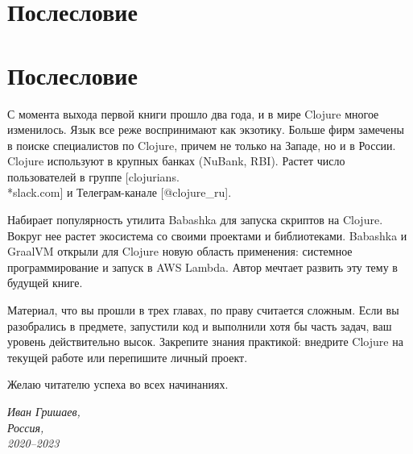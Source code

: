
\ifprint
\chapter{Послесловие}
\else
\chapter*{Послесловие}
\fi

С момента выхода первой книги прошло два года, и в мире Clojure многое
изменилось. Язык все реже воспринимают как экзотику. Больше фирм замечены в
поиске специалистов по Clojure, причем не только на Западе, но и в России. Clojure
используют в крупных банках (NuBank, RBI). Растет число пользователей в группе
[clojurians.\\*slack.com]
и Телеграм-канале [@clo\-ju\-re\_ru].

Набирает популярность утилита Babashka для запуска скриптов на Clojure. Вокруг
нее растет экосистема со своими проектами и библиотеками. Babashka и GraalVM
открыли для Clojure новую область применения: системное программирование и
запуск в AWS Lambda. Автор мечтает развить эту тему в будущей книге.

Материал, что вы прошли в трех главах, по праву считается сложным. Если вы
разобрались в предмете, запустили код и выполнили хотя бы часть задач, ваш
уровень действительно высок. Закрепите знания практикой: внедрите Clojure на
текущей работе или перепишите личный проект.

Желаю читателю успеха во всех начинаниях.

\vspace{1em}

\noindent

\hspace{\fill}\parbox{4cm}{\textit{Иван Гришаев,\\Россия,\\2020--2023}}
